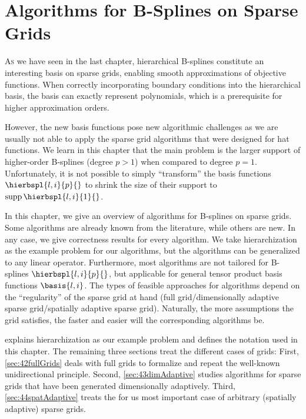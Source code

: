 
\chapter{Algorithms for B-Splines on Sparse Grids}



\lettrine{A}{s} we have seen in the last chapter,
hierarchical B-splines constitute an interesting basis on sparse grids,
enabling smooth approximations of objective functions.
When correctly incorporating boundary conditions into the hierarchical basis,
the basis can exactly represent polynomials,
which is a prerequisite for higher approximation orders.

However, the new basis functions pose new algorithmic challenges
as we are usually not able to apply the sparse grid algorithms
that were designed for hat functions.
We learn in this chapter that the main problem is the larger support
of higher-order B-splines (degree $p > 1$) when compared to degree $p = 1$.
Unfortunately, it is not possible to simply ``transform'' the basis
functions $\hierbspl{l,i}{p}{}$ to shrink the size of their support
to $\supp \hierbspl{l,i}{1}{}$.

In this chapter, we give an overview of algorithms for B-splines
on sparse grids.
Some algorithms are already known from the literature,
while others are new.
In any case, we give correctness results for every algorithm.
We take hierarchization as the example problem for our algorithms,
but the algorithms can be generalized to any linear operator.
Furthermore, most algorithms are not tailored for B-splines $\hierbspl{l,i}{p}{}$,
but applicable for general tensor product basis functions $\basis{l,i}$.
The types of feasible approaches for algorithms
depend on the ``regularity'' of the sparse grid at hand
(full grid/dimensionally adaptive sparse grid/spatially adaptive sparse grid).
Naturally, the more assumptions the grid satisfies, the faster and
easier will the corresponding algorithms be.

 explains hierarchization as our example problem
and defines the notation used in this chapter.
The remaining three sections treat the different cases of grids:
First, \cref{sec:42fullGrids} deals with full grids to formalize and repeat
the well-known unidirectional principle.
Second, \cref{sec:43dimAdaptive} studies algorithms for
sparse grids that have been generated dimensionally adaptively.
Third, \cref{sec:44spatAdaptive} treats the for us most important case
of arbitrary (spatially adaptive) sparse grids.

